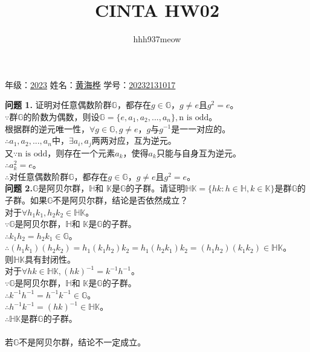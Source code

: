 \documentclass[a4paper]{CINTA}
\title{CINTA HW02}
\author{hhh937meow}
\begin{document}
\maketitle
\begin{center}
    年级：\underline{2023\hspace{1.5cm}} 
    姓名：\underline{黄海桦\hspace{1.5cm}} 
    学号：\underline{20232131017\hspace{1.5cm}} 
\end{center}

\textbf{问题 1.} 证明对任意偶数阶群$\mathbb{G}$，都存在$g \in \mathbb{G}$，$g \neq e$且$g^2 = e$。\\
$\because$群$\mathbb{G}$的阶数为偶数，则设$\mathbb{G}=\{e,a_1,a_2,...,a_n\},\text{n is odd}$。\\
根据群的逆元唯一性，$\forall g \in \mathbb{G},g \neq e$，$g$与$g^{-1}$是一一对应的。\\
$\therefore a_1,a_2,...,a_n$中，$\exists a_i,a_j$两两对应，互为逆元。\\
又$\because \text{n is odd}$，则存在一个元素$a_k$，使得$a_k$只能与自身互为逆元。\\
$\therefore a_k^2=e$。\\
$\therefore$对任意偶数阶群$\mathbb{G}$，都存在$g \in \mathbb{G}$，$g \neq e$且$g^2 = e$。\\

\textbf{问题 2.}$\mathbb{G}$是阿贝尔群，$\mathbb{H}$和 $\mathbb{K}$是$\mathbb{G}$的子群。请证明$\mathbb{H} \mathbb{K} = \{hk: h \in \mathbb{H}, k \in \mathbb{K}\}$是群$\mathbb{G}$的子群。如果$\mathbb{G}$不是阿贝尔群，结论是否依然成立？\\
对于$\forall h_1k_1,h_2k_2 \in \mathbb{HK}$。\\
$\because \mathbb{G}$是阿贝尔群，$\mathbb{H}$和 $\mathbb{K}$是$\mathbb{G}$的子群。\\
$\therefore k_1h_2 = h_2k_1 \in \mathbb{G}$。\\
$\therefore (h_1k_1)(h_2k_2) = h_1(k_1h_2)k_2 = h_1(h_2k_1)k_2 = (h_1h_2)(k_1k_2) \in \mathbb{HK}$。\\
则$\mathbb{HK}$具有封闭性。\\
对于$\forall hk \in \mathbb{HK}, (hk)^{-1} = k^{-1}h^{-1}$。\\
$\because \mathbb{G}$是阿贝尔群，$\mathbb{H}$和 $\mathbb{K}$是$\mathbb{G}$的子群。\\
$\therefore k^{-1}h^{-1}=h^{-1}k^{-1} \in \mathbb{G}$。\\
$\therefore h^{-1}k^{-1}=(hk)^{-1} \in \mathbb{HK}$。\\
$\therefore \mathbb{HK}$是群$\mathbb{G}$的子群。\\
\\
若$\mathbb{G}$不是阿贝尔群，结论不一定成立。\\
\end{document}
